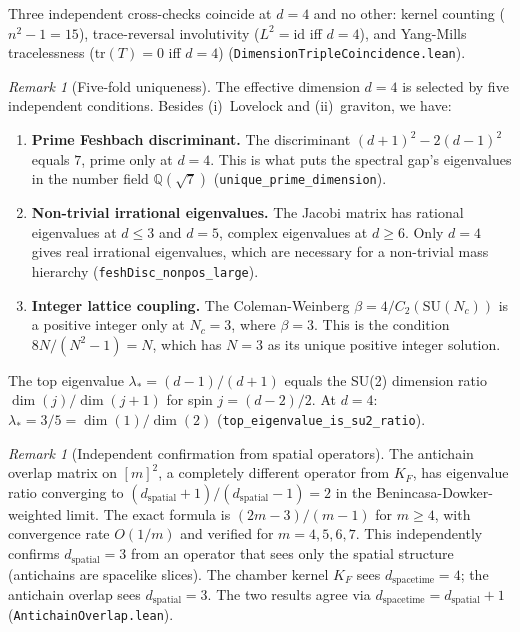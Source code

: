 \documentclass[11pt,letterpaper]{article}
\theoremstyle{remark}
\newtheorem{remark}[theorem]{Remark}
\newcommand{\lean}[1]{\texttt{\small #1}}
\begin{document}
\noindent Three independent cross-checks coincide at $d = 4$ and no
other: kernel counting ($n^2 - 1 = 15$), trace-reversal involutivity
($L^2 = \mathrm{id}$ iff $d = 4$), and Yang-Mills tracelessness
($\mathrm{tr}(T) = 0$ iff $d = 4$) (\lean{DimensionTripleCoincidence.lean}).

\begin{remark}[Five-fold uniqueness]
\label{rem:fivefold}
The effective dimension $d = 4$ is selected by five independent
conditions. Besides (i)~Lovelock and (ii)~graviton, we have:
\begin{enumerate}[nosep,start=3]
  \item \textbf{Prime Feshbach discriminant.} The discriminant
    $(d{+}1)^2 - 2(d{-}1)^2$ equals $7$, prime only at $d = 4$. This
    is what puts the spectral gap's eigenvalues in the number field
    $\mathbb{Q}(\sqrt{7})$ (\lean{unique\_prime\_dimension}).
  \item \textbf{Non-trivial irrational eigenvalues.} The Jacobi
    matrix has rational eigenvalues at $d \leq 3$ and $d = 5$,
    complex eigenvalues at $d \geq 6$. Only $d = 4$ gives real
    irrational eigenvalues, which are necessary for a non-trivial
    mass hierarchy (\lean{feshDisc\_nonpos\_large}).
  \item \textbf{Integer lattice coupling.} The Coleman-Weinberg
    $\beta = 4/C_2(\mathrm{SU}(N_c))$ is a positive integer only at
    $N_c = 3$, where $\beta = 3$. This is the condition
    $8N/(N^2 - 1) = N$, which has $N = 3$ as its unique positive
    integer solution.
\end{enumerate}
The top eigenvalue $\lambda_* = (d{-}1)/(d{+}1)$ equals the SU(2)
dimension ratio $\dim(j)/\dim(j{+}1)$ for spin $j = (d{-}2)/2$. At
$d = 4$: $\lambda_* = 3/5 = \dim(1)/\dim(2)$ (\lean{top\_eigenvalue\_is\_su2\_ratio}).
\end{remark}

\begin{remark}[Independent confirmation from spatial operators]
The antichain overlap matrix on $[m]^2$, a completely different
operator from $K_F$, has eigenvalue ratio converging to
$(d_{\mathrm{spatial}} + 1)/(d_{\mathrm{spatial}} - 1) = 2$ in the
Benincasa-Dowker-weighted limit. The exact formula is
$(2m - 3)/(m - 1)$ for $m \geq 4$, with convergence rate $O(1/m)$
and verified for $m = 4, 5, 6, 7$. This independently confirms
$d_{\mathrm{spatial}} = 3$ from an operator that sees only the
spatial structure (antichains are spacelike slices). The chamber
kernel $K_F$ sees $d_{\mathrm{spacetime}} = 4$; the antichain overlap
sees $d_{\mathrm{spatial}} = 3$. The two results agree via
$d_{\mathrm{spacetime}} = d_{\mathrm{spatial}} + 1$
(\lean{AntichainOverlap.lean}).
\end{remark}
\end{document}
